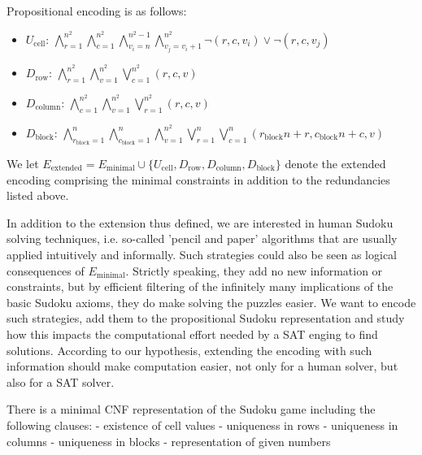 \documentclass[10pt,a4paper,leqno]{article}
\newcommand{\ucell}{U_{\text{cell}}}
\newcommand{\drow}{D_{\text{row}}}
\newcommand{\dcol}{D_{\text{column}}}
\newcommand{\dblock}{D_{\text{block}}}
\begin{document}
Propositional encoding is as follows: 

\begin{itemize}

\item $\ucell$: 
$\bigwedge_{r=1}^{n^2} \bigwedge_{c=1}^{n^2}\bigwedge_{v_i=n}^{n^2 - 1} \bigwedge_{v_j=v_i+1}^{n^2} \neg(r,c,v_i) \lor \neg(r,c,v_j)$


\item $\drow$:
$\bigwedge_{r=1}^{n^2} \bigwedge_{v=1}^{n^2} \bigvee_{c=1}^{n^2} (r,c,v)$

\item $\dcol$: 
$\bigwedge_{c=1}^{n^2} \bigwedge_{v=1}^{n^2} \bigvee_{r=1}^{n^2} (r,c,v)$

\item $\dblock$:  
$\bigwedge_{r_{\text{block}} = 1}^{n} \bigwedge_{c_{\text{block}} = 1}^{n}\bigwedge_{v=1}^{n^2} \bigvee_{r = 1}^{n} \bigvee_{c = 1}^{n} (r_{\text{block}} n + r ,c_{\text{block}} n +c,v) $

\end{itemize}

We let $E_{\text{extended}} = E_{\text{minimal}} \cup \{\ucell,\drow,\dcol,\dblock\}$ denote the extended encoding comprising the minimal constraints in addition to the redundancies listed above. 

In addition to the extension thus defined, we are interested in human Sudoku solving techniques, i.e. so-called 'pencil and paper' algorithms that are usually applied intuitively and informally. Such strategies could also be seen as logical consequences of $E_{\text{minimal}}$. Strictly speaking, they add no new information or constraints, but by efficient filtering of the infinitely many implications of the basic Sudoku axioms, they do make solving the puzzles easier. We want to encode such strategies, add them to the propositional Sudoku representation and study how this impacts the computational effort needed by a SAT enging to find solutions. According to our hypothesis, extending the encoding with such information should make computation easier, not only for a human solver, but also for a SAT solver.







There is a minimal CNF representation of the Sudoku game including the following clauses:
- existence of cell values
- uniqueness in rows
- uniqueness in columns
- uniqueness in blocks
- representation of given numbers
\end{document}
